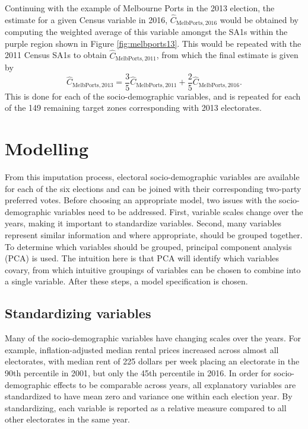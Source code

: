 \documentclass[times, doublespace]{anzsauth}
\begin{document}
Continuing with the example of Melbourne Ports in the 2013 election, the estimate for a given Census variable in 2016, \(\hat{C}_{\text{MelbPorts}, 2016}\) would be obtained by computing the weighted average of this variable amongst the SA1s within the purple region shown in Figure \ref{fig:melbports13}. This would be repeated with the 2011 Census SA1s to obtain \(\hat{C}_{\text{MelbPorts}, 2011}\), from which the final estimate is given by
\[
  \hat{C}_{\text{MelbPorts},2013}
    = \frac{3}{5} \hat{C}_{\text{MelbPorts},2011} + \frac{2}{5} \hat{C}_{\text{MelbPorts},2016}.
\]
This is done for each of the socio-demographic variables, and is repeated for each of the 149 remaining target zones corresponding with 2013 electorates.

\hypertarget{modelling}{%
\section{Modelling}\label{modelling}}

From this imputation process, electoral socio-demographic variables are available for each of the six elections and can be joined with their corresponding two-party preferred votes. Before choosing an appropriate model, two issues with the socio-demographic variables need to be addressed. First, variable scales change over the years, making it important to standardize variables. Second, many variables represent similar information and where appropriate, should be grouped together. To determine which variables should be grouped, principal component analysis (PCA) is used. The intuition here is that PCA will identify which variables covary, from which intuitive groupings of variables can be chosen to combine into a single variable. After these steps, a model specification is chosen.

\hypertarget{standardizing-variables}{%
\subsection{Standardizing variables}\label{standardizing-variables}}

Many of the socio-demographic variables have changing scales over the years. For example, inflation-adjusted median rental prices increased across almost all electorates, with median rent of 225 dollars per week placing an electorate in the 90th percentile in 2001, but only the 45th percentile in 2016. In order for socio-demographic effects to be comparable across years, all explanatory variables are standardized to have mean zero and variance one within each election year. By standardizing, each variable is reported as a relative measure compared to all other electorates in the same year.
\end{document}
